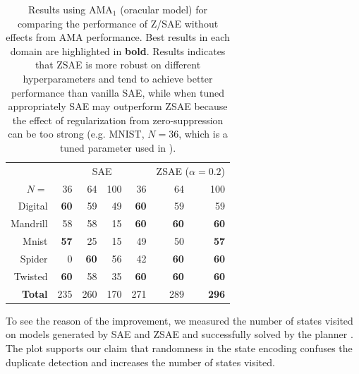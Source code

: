 \begin{table}[htbp]
\centering
{}
\begin{tabular}{|r|rrr|rrr|}
 & \multicolumn{4}{c|}{SAE} & \multicolumn{4}{c|}{ZSAE ($\alpha=0.2$)} \\ 
$N=$           & {36}        & {64}        & {100} & {36}        & {64}        & {100}        \\ \hline
Digital        & \textbf{60} & 59          & 49    & \textbf{60} & 59          & 59           \\
Mandrill       & 58          & 58          & 15    & \textbf{60} & \textbf{60} & \textbf{60}  \\
Mnist          & \textbf{57} & 25          & 15    & 49          & 50          & \textbf{57}  \\
Spider         & 0           & \textbf{60} & 56    & 42          & \textbf{60} & \textbf{60}  \\
Twisted        & \textbf{60} & 58          & 35    & \textbf{60} & \textbf{60} & \textbf{60}  \\
\textbf{Total} & {235}       & {260}       & {170} & {271}       & {289}       & \textbf{296} \\
\end{tabular}
\caption{Results using AMA$_1$ (oracular model) for comparing the performance of Z/SAE without effects from AMA performance.
Best results in each domain are highlighted in \textbf{bold}.
Results indicates that ZSAE is more robust on different hyperparameters and tend to achieve better performance than vanilla SAE,
while when tuned appropriately SAE may outperform ZSAE because the effect of regularization from zero-suppression can be too strong
(e.g. MNIST, $N=36$, which is a tuned parameter used in \cite{Asai2018}).
}
\label{tab:ama1}
\end{table}

To see the reason of the improvement, we measured the number of states
visited on models generated by SAE and ZSAE and successfully solved by
the planner . The plot supports our claim that
randomness in the state encoding confuses the duplicate detection and
increases the number of states visited.

